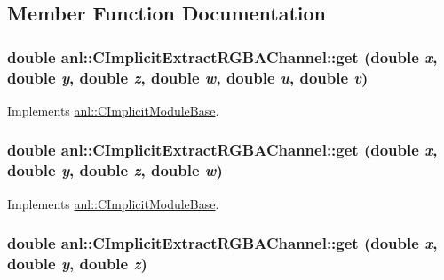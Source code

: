 \subsection{Member Function Documentation}
\hypertarget{classanl_1_1CImplicitExtractRGBAChannel_a34f8c1bbb5757b600f96ef5bc18f5f70}{
\subsubsection[{get}]{\setlength{\rightskip}{0pt plus 5cm}double anl::CImplicitExtractRGBAChannel::get (double {\em x}, \/  double {\em y}, \/  double {\em z}, \/  double {\em w}, \/  double {\em u}, \/  double {\em v})}}
\label{classanl_1_1CImplicitExtractRGBAChannel_a34f8c1bbb5757b600f96ef5bc18f5f70}


Implements \hyperlink{classanl_1_1CImplicitModuleBase_aa40b7d54572197612a4fea44b63447eb}{anl::CImplicitModuleBase}.\hypertarget{classanl_1_1CImplicitExtractRGBAChannel_a89cec90ae47f3210f1e12f647514d1c2}{
\subsubsection[{get}]{\setlength{\rightskip}{0pt plus 5cm}double anl::CImplicitExtractRGBAChannel::get (double {\em x}, \/  double {\em y}, \/  double {\em z}, \/  double {\em w})}}
\label{classanl_1_1CImplicitExtractRGBAChannel_a89cec90ae47f3210f1e12f647514d1c2}


Implements \hyperlink{classanl_1_1CImplicitModuleBase_a3cf520bdab59631864253c03b4e1723f}{anl::CImplicitModuleBase}.\hypertarget{classanl_1_1CImplicitExtractRGBAChannel_ad9ffeeea3e53af27d4c2fd3dc81ea1bc}{
\subsubsection[{get}]{\setlength{\rightskip}{0pt plus 5cm}double anl::CImplicitExtractRGBAChannel::get (double {\em x}, \/  double {\em y}, \/  double {\em z})}}
\label{classanl_1_1CImplicitExtractRGBAChannel_ad9ffeeea3e53af27d4c2fd3dc81ea1bc}


